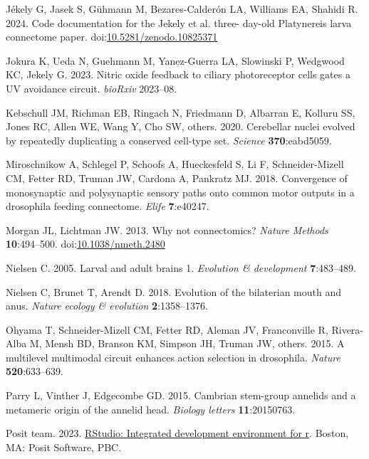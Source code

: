 \documentclass[
  11pt,
]{article}
\newlength{\cslhangindent}
\newenvironment{CSLReferences}[2] %
 {\begin{list}{}{%
  \setlength{\itemindent}{0pt}
  \setlength{\leftmargin}{0pt}
  \setlength{\parsep}{0pt}
  \ifodd #1
   \setlength{\leftmargin}{\cslhangindent}
   \setlength{\itemindent}{-1\cslhangindent}
  \fi
  \setlength{\itemsep}{#2\baselineskip}}}
 {\end{list}}
\begin{document}
\begin{CSLReferences}{1}{0}
Jékely G, Jasek S, Gühmann M, Bezares-Calderón LA, Williams EA, Shahidi
R. 2024. {Code documentation for the Jekely et al. three- day-old
Platynereis larva connectome paper}.
doi:\href{https://doi.org/10.5281/zenodo.10825371}{10.5281/zenodo.10825371}

Jokura K, Ueda N, Guehmann M, Yanez-Guerra LA, Slowinski P, Wedgwood KC,
Jekely G. 2023. Nitric oxide feedback to ciliary photoreceptor cells
gates a UV avoidance circuit. \emph{bioRxiv} 2023--08.

Kebschull JM, Richman EB, Ringach N, Friedmann D, Albarran E, Kolluru
SS, Jones RC, Allen WE, Wang Y, Cho SW, others. 2020. Cerebellar nuclei
evolved by repeatedly duplicating a conserved cell-type set.
\emph{Science} \textbf{370}:eabd5059.

Miroschnikow A, Schlegel P, Schoofs A, Hueckesfeld S, Li F,
Schneider-Mizell CM, Fetter RD, Truman JW, Cardona A, Pankratz MJ. 2018.
Convergence of monosynaptic and polysynaptic sensory paths onto common
motor outputs in a drosophila feeding connectome. \emph{Elife}
\textbf{7}:e40247.

Morgan JL, Lichtman JW. 2013. Why not connectomics? \emph{Nature
Methods} \textbf{10}:494--500.
doi:\href{https://doi.org/10.1038/nmeth.2480}{10.1038/nmeth.2480}

Nielsen C. 2005. Larval and adult brains 1. \emph{Evolution \&
development} \textbf{7}:483--489.

Nielsen C, Brunet T, Arendt D. 2018. Evolution of the bilaterian mouth
and anus. \emph{Nature ecology \& evolution} \textbf{2}:1358--1376.

Ohyama T, Schneider-Mizell CM, Fetter RD, Aleman JV, Franconville R,
Rivera-Alba M, Mensh BD, Branson KM, Simpson JH, Truman JW, others.
2015. A multilevel multimodal circuit enhances action selection in
drosophila. \emph{Nature} \textbf{520}:633--639.

Parry L, Vinther J, Edgecombe GD. 2015. Cambrian stem-group annelids and
a metameric origin of the annelid head. \emph{Biology letters}
\textbf{11}:20150763.

Posit team. 2023. \href{http://www.posit.co/}{RStudio: Integrated
development environment for r}. Boston, MA: Posit Software, PBC.


\end{CSLReferences}
\end{document}
